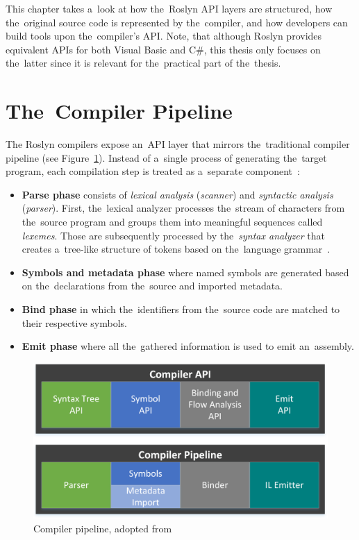 \documentclass[
  digital, %
  table,   %
  lof,     %
  lot,     %
  oneside,
]{fithesis3}
\begin{document}
This chapter takes a~look at how the~Roslyn API layers are structured, how the~original source code is represented by the~compiler, and how developers can build tools upon the~compiler's API. Note, that although Roslyn provides equivalent APIs for both Visual Basic and C\#, this thesis only focuses on the~latter since it is relevant for the~practical part of the~thesis.  
  
\section{The~Compiler Pipeline}
The Roslyn compilers expose an~API layer that mirrors the~traditional compiler pipeline (see Figure~\ref{fig:roslyn-compiler-pipeline}). Instead of a~single process of generating the~target program, each compilation step is treated as a~separate component~\cite{roslyn-overview}:

\begin{itemize}
  \item \textbf{Parse phase} consists of \textit{lexical analysis} (\textit{scanner}) and \textit{syntactic analysis} (\textit{parser}). First, the~lexical analyzer processes the~stream of characters from the~source program and groups them into meaningful sequences called \textit{lexemes}. Those are subsequently processed by the~\textit{syntax analyzer} that creates a~tree-like structure of tokens based on the~language grammar~\cite{dragon-book}.

  \item \textbf{Symbols and metadata phase} where named symbols are generated based on the~declarations from the~source and imported metadata.

  \item \textbf{Bind phase} in which the~identifiers from the~source code are matched to their respective symbols.

  \item \textbf{Emit phase} where all the~gathered information is used to emit an~assembly.
\end{itemize}

\begin{figure}[h!]
		\centering
			\includegraphics[scale=0.85]{img/roslyn-compiler-pipeline}
		\caption{Compiler pipeline, adopted from~\cite{roslyn-overview}}
		\label{fig:roslyn-compiler-pipeline}
\end{figure}
\end{document}
